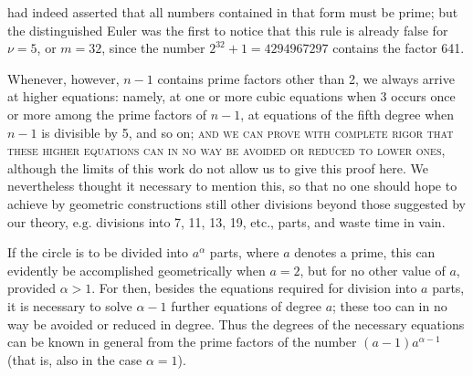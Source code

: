 had indeed asserted that all numbers contained in that form must be prime; but the distinguished Euler was the first to notice that this rule is already false for \(\nu=5\), or \(m=32\), since the number \(2^{32}+1=4294967297\) contains the factor 641.

Whenever, however, \(n-1\) contains prime factors other than 2, we always arrive at higher equations: namely, at one or more cubic equations when 3 occurs once or more among the prime factors of \(n-1\), at equations of the fifth degree when \(n-1\) is divisible by 5, and so on; \textsc{and we can prove with complete rigor that these higher equations can in no way be avoided or reduced to lower ones,} although the limits of this work do not allow us to give this proof here. We nevertheless thought it necessary to mention this, so that no one should hope to achieve by geometric constructions still other divisions beyond those suggested by our theory, \(\text{e.g.}\) divisions into 7, 11, 13, 19, etc., parts, and waste time in vain.


If the circle is to be divided into \(a^\alpha\) parts, where \(a\) denotes a prime, this can evidently be accomplished geometrically when \(a=2\), but for no other value of \(a\), provided \(\alpha>1\). For then, besides the equations required for division into \(a\) parts, it is necessary to solve \(\alpha-1\) further equations of degree \(a\); these too can in no way be avoided or reduced in degree. Thus the degrees of the necessary equations can be known in general from the prime factors of the number \((a-1)a^{\alpha-1}\) (that is, also in the case \(\alpha=1\)).

